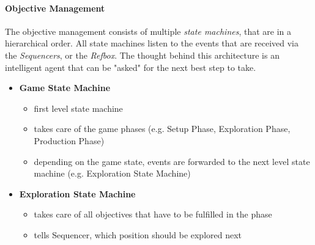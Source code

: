 \paragraph{Objective Management}
The objective management consists of multiple \textit{state machines}, that are in
a hierarchical order.
All state machines listen to the events that are received via the \textit{Sequencers}, or
the \textit{Refbox}.
The thought behind this architecture is an intelligent agent that can be "asked" for the next
best step to take.\\

\begin{itemize}
    \item \textbf{Game State Machine}
    \begin{itemize}
        \item first level state machine
        \item takes care of the game phases (e.g. Setup Phase, Exploration Phase, Production Phase)
         \item depending on the game state, events are forwarded to the next level state machine (e.g. Exploration State Machine)
    \end{itemize}
    \item \textbf{Exploration State Machine}
    \begin{itemize}
        \item takes care of all objectives that have to be fulfilled in the phase
        \item tells Sequencer, which position should be explored next
    \end{itemize}
\end{itemize}

